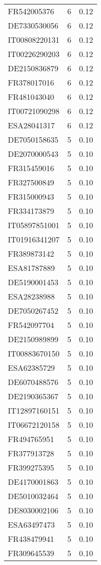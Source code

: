 \begin{table*}[htbp]
\begin{tabular}{lrr}
FR542005376 & 6 & 0.12 \\
DE7330530056 & 6 & 0.12 \\
IT00808220131 & 6 & 0.12 \\
IT00226290203 & 6 & 0.12 \\
DE2150836879 & 6 & 0.12 \\
FR378017016 & 6 & 0.12 \\
FR481043040 & 6 & 0.12 \\
IT00721090298 & 6 & 0.12 \\
ESA28041317 & 6 & 0.12 \\
DE7050158635 & 5 & 0.10 \\
DE2070000543 & 5 & 0.10 \\
FR315459016 & 5 & 0.10 \\
FR327500849 & 5 & 0.10 \\
FR315000943 & 5 & 0.10 \\
FR334173879 & 5 & 0.10 \\
IT05897851001 & 5 & 0.10 \\
IT01916341207 & 5 & 0.10 \\
FR389873142 & 5 & 0.10 \\
ESA81787889 & 5 & 0.10 \\
DE5190001453 & 5 & 0.10 \\
ESA28238988 & 5 & 0.10 \\
DE7050267452 & 5 & 0.10 \\
FR542097704 & 5 & 0.10 \\
DE2150989899 & 5 & 0.10 \\
IT00883670150 & 5 & 0.10 \\
ESA62385729 & 5 & 0.10 \\
DE6070488576 & 5 & 0.10 \\
DE2190365367 & 5 & 0.10 \\
IT12897160151 & 5 & 0.10 \\
IT06672120158 & 5 & 0.10 \\
FR494765951 & 5 & 0.10 \\
FR377913728 & 5 & 0.10 \\
FR399275395 & 5 & 0.10 \\
DE4170001863 & 5 & 0.10 \\
DE5010032464 & 5 & 0.10 \\
DE8030002106 & 5 & 0.10 \\
ESA63497473 & 5 & 0.10 \\
FR438479941 & 5 & 0.10 \\
FR309645539 & 5 & 0.10 \\

\end{tabular}
\end{table*}
